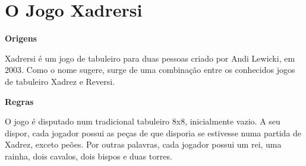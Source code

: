 \documentclass[a4paper]{article}
\begin{document}

\newpage

%
%
%
%
%
%
%


\section{O Jogo Xadrersi}

\textbf{Origens}\linebreak

Xadrersi é um jogo de tabuleiro para duas pessoas criado por Andi Lewicki, em 2003. Como o nome sugere, surge de uma combinação entre os conhecidos jogos de tabuleiro Xadrez e Reversi.\linebreak

\textbf{Regras}\linebreak

O jogo é disputado num tradicional tabuleiro 8x8, inicialmente vazio. A seu dispor, cada jogador possui as peças de que disporia se estivesse numa partida de Xadrez, exceto peões.
Por outras palavras, cada jogador possui um rei, uma rainha, dois cavalos, dois bispos e duas torres.\linebreak
\end{document}
